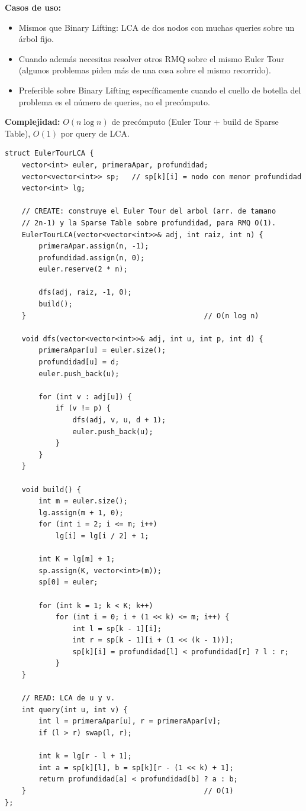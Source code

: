 \documentclass[10pt,a4paper,twocolumn]{article}
\begin{document}
\textbf{Casos de uso:}

\begin{itemize}
    \item Mismos que Binary Lifting: LCA de dos nodos con muchas
    queries sobre un árbol fijo.
    \item Cuando además necesitas resolver otros RMQ sobre el mismo
    Euler Tour (algunos problemas piden más de una cosa sobre el
    mismo recorrido).
    \item Preferible sobre Binary Lifting específicamente cuando el
    cuello de botella del problema es el número de queries, no el
    precómputo.
\end{itemize}

\textbf{Complejidad:} $O(n \log n)$ de precómputo (Euler Tour +
build de Sparse Table), $O(1)$ por query de LCA.

\begin{lstlisting}[style=cpp]
struct EulerTourLCA {
    vector<int> euler, primeraApar, profundidad;
    vector<vector<int>> sp;   // sp[k][i] = nodo con menor profundidad
    vector<int> lg;

    // CREATE: construye el Euler Tour del arbol (arr. de tamano
    // 2n-1) y la Sparse Table sobre profundidad, para RMQ O(1).
    EulerTourLCA(vector<vector<int>>& adj, int raiz, int n) {
        primeraApar.assign(n, -1);
        profundidad.assign(n, 0);
        euler.reserve(2 * n);

        dfs(adj, raiz, -1, 0);
        build();
    }                                          // O(n log n)

    void dfs(vector<vector<int>>& adj, int u, int p, int d) {
        primeraApar[u] = euler.size();
        profundidad[u] = d;
        euler.push_back(u);

        for (int v : adj[u]) {
            if (v != p) {
                dfs(adj, v, u, d + 1);
                euler.push_back(u);
            }
        }
    }

    void build() {
        int m = euler.size();
        lg.assign(m + 1, 0);
        for (int i = 2; i <= m; i++)
            lg[i] = lg[i / 2] + 1;

        int K = lg[m] + 1;
        sp.assign(K, vector<int>(m));
        sp[0] = euler;

        for (int k = 1; k < K; k++)
            for (int i = 0; i + (1 << k) <= m; i++) {
                int l = sp[k - 1][i];
                int r = sp[k - 1][i + (1 << (k - 1))];
                sp[k][i] = profundidad[l] < profundidad[r] ? l : r;
            }
    }

    // READ: LCA de u y v.
    int query(int u, int v) {
        int l = primeraApar[u], r = primeraApar[v];
        if (l > r) swap(l, r);

        int k = lg[r - l + 1];
        int a = sp[k][l], b = sp[k][r - (1 << k) + 1];
        return profundidad[a] < profundidad[b] ? a : b;
    }                                          // O(1)
};
\end{lstlisting}
\end{document}
